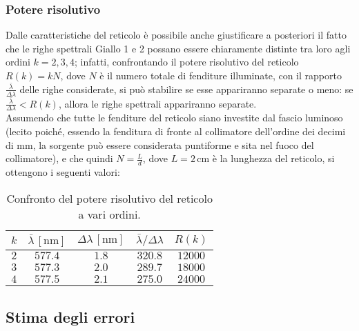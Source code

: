 \documentclass[]{article}
\let\oldsubsection\subsection%
\renewcommand{\subsection}{%
	\renewcommand{\theequation}{\thesubsection.\arabic{equation}}%
	\oldsubsection}%
\begin{document}
    \subsubsection{Potere risolutivo}
    Dalle caratteristiche del reticolo è possibile anche giustificare a posteriori il fatto che le righe spettrali Giallo 1 e 2 possano essere chiaramente distinte tra loro agli ordini $k = 2, 3, 4$; infatti, confrontando il potere risolutivo del reticolo $R(k) = k N$, dove $N$ è il numero totale di fenditure illuminate, con il rapporto $\frac{\bar{\lambda}}{\Delta\lambda}$ delle righe considerate, si può stabilire se esse appariranno separate o meno: se $\frac{\bar{\lambda}}{\Delta\lambda} < R(k)$, allora le righe spettrali appariranno separate.\\
    Assumendo che tutte le fenditure del reticolo siano investite dal fascio luminoso (lecito poiché, essendo la fenditura di fronte al collimatore dell'ordine dei decimi di mm, la sorgente può essere considerata puntiforme e sita nel fuoco del collimatore), e che quindi $N = \frac{L}{d}$, dove $L = 2 \,\text{cm}$ è la lunghezza del reticolo, si ottengono i seguenti valori:
    \begin{table}[H]
        \centering
        \begin{tabular}{||c|c|c|c|c||}
            \hline
            $k$ & $\bar{\lambda} \, \left[\text{nm}\right]$ & $\Delta\lambda \, \left[\text{nm}\right]$ & $\bar{\lambda}/\Delta\lambda$ & $R(k)$ \\
            \hline\hline
            $2$ & $577.4$ & $1.8$ & $320.8$ & $12000$ \\\hline
            $3$ & $577.3$ & $2.0$ & $289.7$ & $18000$ \\\hline
            $4$ & $577.5$ & $2.1$ & $275.0$ & $24000$ \\\hline
        \end{tabular}
        \caption{Confronto del potere risolutivo del reticolo a vari ordini.}
        \label{R}
    \end{table}

    \subsection{Stima degli errori}
\end{document}
